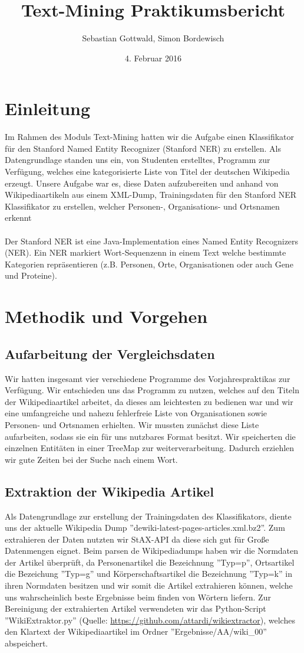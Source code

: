 \documentclass[a4paper]{article}
\author{Sebastian Gottwald, Simon Bordewisch}
\title{Text-Mining Praktikumsbericht}
\date{4. Februar 2016}
\begin{document}
\maketitle
\newpage
\section{Einleitung}
Im Rahmen des Moduls Text-Mining hatten wir die Aufgabe einen Klassifikator für den Stanford Named Entity Recognizer (Stanford NER) zu erstellen. Als Datengrundlage standen uns ein, von Studenten erstelltes, Programm zur Verfügung, welches eine kategorisierte Liste von Titel der deutschen Wikipedia erzeugt. Unsere Aufgabe war es, diese Daten aufzubereiten und anhand von Wikipediaartikeln aus einem XML-Dump, Trainingsdaten für den Stanford NER Klassifikator zu erstellen, welcher Personen-, Organisations- und Ortsnamen erkennt
\\\\
Der Stanford NER ist eine Java-Implementation eines Named Entity Recognizers (NER). Ein NER markiert Wort-Sequenzenn in einem Text welche bestimmte Kategorien repräsentieren (z.B. Personen, Orte, Organisationen oder auch Gene und Proteine).
\section{Methodik und Vorgehen}
\subsection{Aufarbeitung der Vergleichsdaten}
Wir hatten insgesamt vier verschiedene Programme des Vorjahrespraktikas zur Verfügung. Wir entschieden uns das Programm zu nutzen, welches auf den Titeln der Wikipediaartikel arbeitet, da dieses am leichtesten zu bedienen war und wir eine umfangreiche und nahezu fehlerfreie Liste von Organisationen sowie Personen- und Ortsnamen erhielten. Wir mussten zunächst diese Liste aufarbeiten, sodass sie ein für uns nutzbares Format besitzt. Wir speicherten die einzelnen Entitäten in einer TreeMap zur weiterverarbeitung. Dadurch erziehlen wir gute Zeiten bei der Suche nach einem Wort.

\subsection{Extraktion der Wikipedia Artikel}
Als Datengrundlage zur erstellung der Trainingsdaten des Klassifikators, diente uns der aktuelle Wikipedia Dump ''dewiki-latest-pages-articles.xml.bz2''. Zum extrahieren der Daten nutzten wir StAX-API da diese sich gut für Große Datenmengen eignet. Beim parsen de Wikipediadumps haben wir die Normdaten der Artikel überprüft, da Personenartikel die Bezeichnung ''Typ=p'', Ortsartikel die Bezeichung ''Typ=g'' und Körperschaftsartikel die Bezeichnung ''Typ=k'' in ihren Normdaten besitzen und wir somit die Artikel extrahieren können, welche uns wahrscheinlich beste Ergebnisse beim finden von Wörtern liefern. Zur Bereinigung der extrahierten Artikel verwendeten wir das Python-Script ''WikiExtraktor.py'' (Quelle: \url{https://github.com/attardi/wikiextractor}), welches den Klartext der Wikipediaartikel im Ordner ''Ergebnisse/AA/wiki\_00'' abspeichert.
\end{document}
